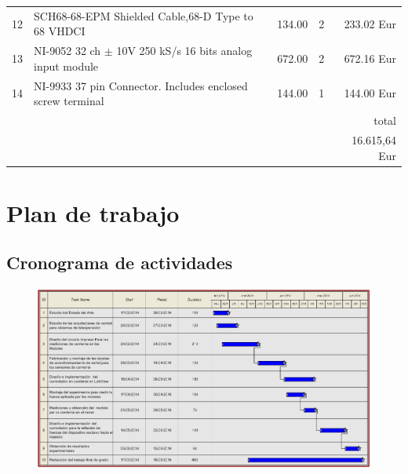 \begin{table}
\begin{tabular}{l l r c r}
 12       & SCH68-68-EPM Shielded Cable,68-D Type to 68 VHDCI  & 134.00  			&	2     & 233.02 Eur\\
 13       & NI-9052 32 ch $\pm$ 10V 250 kS/s 16 bits analog input module  & 672.00 &   2      & 672.16  Eur\\
 14       & NI-9933 37 pin Connector. Includes enclosed screw terminal    & 144.00 &   1     & 144.00 Eur\\
 \hline
 \hline
    &        &                  &       & total          \\      
    &        &                  &       & 16.615,64 Eur          \\      
 \hline
 \hline
\end{tabular}
\end{table}


    

\section{Plan de trabajo}   
\subsection{Cronograma de actividades}



\begin{figure}
\includegraphics[scale=0.7]{FiguresP/Gant}
\end{figure}


